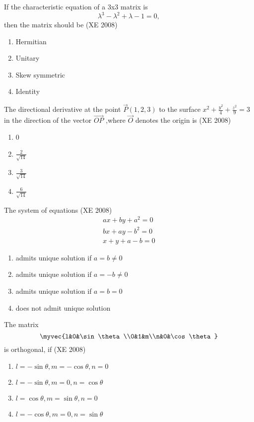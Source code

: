 \item If the characteristic equation of a 3x3 matrix is $$\lambda^3 - \lambda^2 + \lambda - 1 =0,$$ then the matrix should be 
\hfill (XE 2008)
\begin{multicols}{4}
\begin{enumerate}
\item  Hermitian 
\item Unitary
 \item Skew symmetric
\item Identity
\end{enumerate}
\end{multicols}
\item The directional derivative at the point $\vec{P}(1,2,3)$ to the surface {\large $x^2 + \frac{y^2}{4} + \frac{z^2}{9} =3$} in the direction of the vector $\overrightarrow{OP}$ ,where $\vec{O}$ denotes the origin is
\hfill (XE 2008)
\begin{multicols}{4}
\begin{enumerate}
\item 0
\item {$\frac{2}{\sqrt{14}}$}
\item {$\frac{3}{\sqrt{14}}$}
\item {$\frac{6}{\sqrt{14}}$}
\end{enumerate}
\end{multicols}
\item The system of equations 
\hfill (XE 2008)
	\begin{align*}	 ax+by+a^2=0  \\ bx+ay-b^2=0 \\ x+y+a-b=0
	\end{align*}
\begin{enumerate}
\item  admits unique solution if $a=b\ne 0$
\item admits unique solution if $a=-b\ne 0$
\item admits unique solution if $a=b=0$
\item does not admit unique solution
\end{enumerate}
\item The matrix $$\myvec{l&0&\sin\theta\\0&1&m\\n&0&\cos\theta}$$ is orthogonal, if
\hfill (XE 2008)
\begin{multicols}{2}
\begin{enumerate}
\item $l=-\sin\theta, m=-\cos\theta, n=0$
\item $l=-\sin\theta, m=0, n=\cos\theta$
\item $l=\cos\theta, m=\sin\theta, n=0$
\item $l=-\cos\theta, m=0, n=\sin\theta$
\end{enumerate}
\end{multicols}


